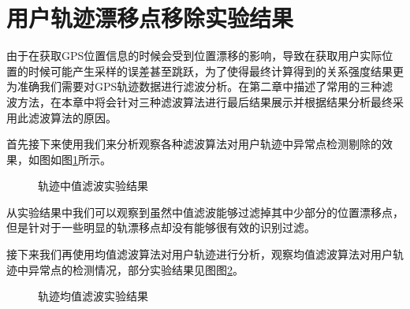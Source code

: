 \section{用户轨迹漂移点移除实验结果}
由于在获取GPS位置信息的时候会受到位置漂移的影响，导致在获取用户实际位置的时候可能产生采样的误差甚至跳跃，为了使得最终计算得到的关系强度结果更为准确我们需要对GPS轨迹数据进行滤波分析。在第二章中描述了常用的三种滤波方法，在本章中将会针对三种滤波算法进行最后结果展示并根据结果分析最终采用此滤波算法的原因。
\par 首先接下来使用我们来分析观察各种滤波算法对用户轨迹中异常点检测剔除的效果，如图如图\ref{fig:3_2_1}所示。
\begin{figure}[htb]
  \centering%
  \hspace{4em}%
  \caption{轨迹中值滤波实验结果}
  \label{fig:3_2_1}
\end{figure}
\par 从实验结果中我们可以观察到虽然中值滤波能够过滤掉其中少部分的位置漂移点，但是针对于一些明显的轨漂移点却没有能够很有效的识别过滤。
\par 接下来我们再使用均值滤波算法对用户轨迹进行分析，观察均值滤波算法对用户轨迹中异常点的检测情况，部分实验结果见图图\ref{fig:3_3_1}。
\begin{figure}[htb]
  \centering%
  \hspace{4em}%
  \caption{轨迹均值滤波实验结果}
  \label{fig:3_3_1}
\end{figure}
